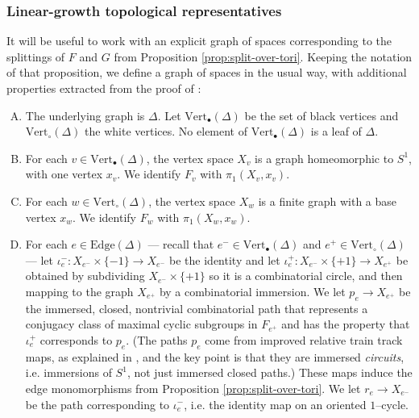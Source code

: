 \documentclass[11pt,oneside]{amsart}
\newcounter{ax}
\theoremstyle{definition}
\newcommand{\vertices}{\mathrm{Vert}}
\newcommand{\edges}{\mathrm{Edge}}
\begin{document}
\subsubsection{Linear-growth topological representatives}\label{subsec:linear-top-rep}
It will be useful to work with an explicit graph of spaces corresponding to the splittings of $F$ and $G$ from Proposition \ref{prop:split-over-tori}.  Keeping the notation of that proposition, we define a graph of spaces in the usual way, with  additional properties extracted from the proof of \cite[Thm. 2.7]{DahmaniTouikan}:
\begin{enumerate}[(A)]
    \item The underlying graph is $\Delta$.  Let $\vertices_\bullet(\Delta)$ be the set of black vertices and $\vertices_\circ(\Delta)$ the white vertices.  No element of $\vertices_\bullet(\Delta)$ is a leaf of $\Delta$.\label{item:multitwist-verts}

    \item For each $v\in \vertices_\bullet(\Delta)$, the vertex space $X_v$ is a graph homeomorphic to $S^1$, with one vertex $x_v$.  We identify $F_v$ with $\pi_1(X_v,x_v)$. \label{item:multitwist-vertspace-black}

    \item For each $w\in\vertices_\circ(\Delta)$, the vertex space $X_w$ is a finite graph with a base vertex $x_w$.  We identify $F_w$ with $\pi_1(X_w,x_w)$. \label{item:multitwist-vertspace-white}

    \item For each $e\in\edges(\Delta)$ --- recall that $e^-\in\vertices_\bullet(\Delta)$ and $e^+\in\vertices_\circ(\Delta)$ --- let $\iota_e^-:X_{e^-}\times\{-1\}\to X_{e^-}$ be the identity and let $\iota_{e}^+:X_{e^-}\times\{+1\}\to X_{e^+}$ be obtained by subdividing $X_{e^-}\times\{+1\}$ so it is a combinatorial circle, and then mapping to the graph $X_{e^+}$ by a combinatorial immersion.  We let $p_e\to X_{e^+}$ be the immersed, closed, nontrivial combinatorial path that represents a conjugacy class of maximal cyclic subgroups in $F_{e^+}$ and has the property that $\iota_{e}^+$ corresponds to $p_e$.  (The paths $p_e$ come from improved relative train track maps, as explained in \cite{DahmaniTouikan}, and the key point is that they are immersed \emph{circuits}, i.e. immersions of $S^1$, not just immersed closed paths.)  These maps induce the edge monomorphisms from Proposition \ref{prop:split-over-tori}.  We let $r_e\to X_{e^-}$ be the path corresponding to $\iota_e^-$, i.e. the identity map on an oriented $1$--cycle. \label{item:multitwist-edges}


\end{enumerate}
\end{document}
